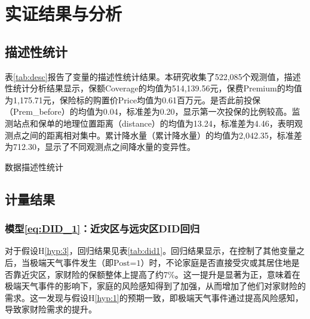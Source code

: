 \chapter{实证结果与分析}\label{chap:4}
\section{描述性统计}

表\ref{tab:desc}报告了变量的描述性统计结果。本研究收集了522,085个观测值，描述性统计分析结果显示，保额Coverage的均值为514,139.56元，保费Premium的均值为1,175.71元，保险标的购置价Price均值为0.61百万元。是否此前投保（Prem\_before）的均值为0.04，标准差为0.20，显示第一次投保的比例较高。监测站点和保单的地理位置距离（distance）的均值为13.24，标准差为4.46，表明观测点之间的距离相对集中。累计降水量（累计降水量）的均值为2,042.35，标准差为712.30，显示了不同观测点之间降水量的变异性。

\begin{table}[H]
    \caption{数据描述性统计}\label{tab:desc}
    \centering
    
\end{table}

%     

\section{计量结果}

%     

\subsection{模型\ref{eq:DID_1}：近灾区与远灾区DID回归}
对于假设H\ref{hyp:3}，回归结果见表\ref{tab:did1}。回归结果显示，在控制了其他变量之后，当极端天气事件发生（即$\text{Post=1}$）时，不论家庭是否直接受灾或其居住地是否靠近灾区，家财险的保额整体上提高了约7\%。这一提升是显著为正，意味着在极端天气事件的影响下，家庭的风险感知得到了加强，从而增加了他们对家财险的需求。这一发现与假设H\ref{hyp:1}的预期一致，即极端天气事件通过提高风险感知，导致家财险需求的提升。

